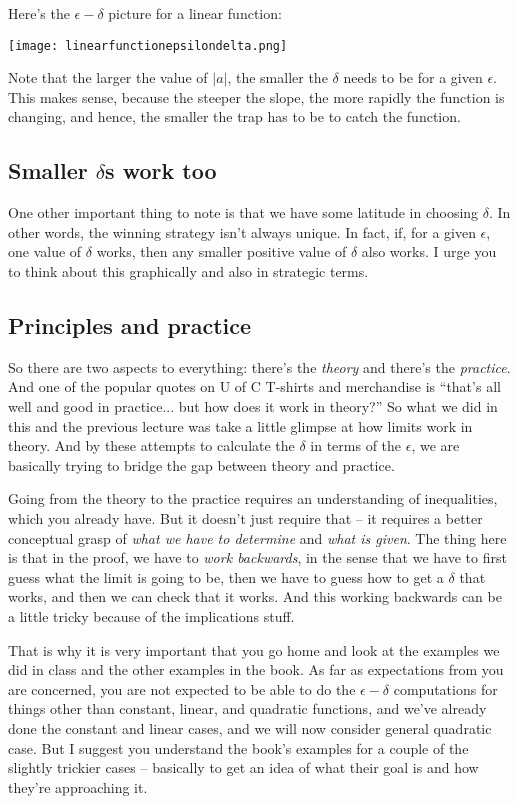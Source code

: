 \documentclass[10pt]{amsart}
\begin{document}
Here's the $\epsilon-\delta$ picture for a linear function:

\texttt{[image: linearfunctionepsilondelta.png]}

Note that the larger the value of $|a|$, the smaller the $\delta$
needs to be for a given $\epsilon$. This makes sense, because the
steeper the slope, the more rapidly the function is changing, and
hence, the smaller the trap has to be to catch the function.

\subsection{Smaller $\delta$s work too}

One other important thing to note is that we have some latitude in
choosing $\delta$. In other words, the winning strategy isn't always
unique. In fact, if, for a given $\epsilon$, one value of $\delta$
works, then any smaller positive value of $\delta$ also works. I urge
you to think about this graphically and also in strategic terms.

\subsection{Principles and practice}

So there are two aspects to everything: there's the {\em theory} and
there's the {\em practice}. And one of the popular quotes on U of C
T-shirts and merchandise is ``that's all well and good in
practice... but how does it work in theory?'' So what we did in this
and the previous lecture was take a little glimpse at how limits work
in theory. And by these attempts to calculate the $\delta$ in terms of
the $\epsilon$, we are basically trying to bridge the gap between
theory and practice.

Going from the theory to the practice requires an understanding of
inequalities, which you already have. But it doesn't just require that
-- it requires a better conceptual grasp of {\em what we have to
determine} and {\em what is given}. The thing here is that in the
proof, we have to {\em work backwards}, in the sense that we have to
first guess what the limit is going to be, then we have to guess how
to get a $\delta$ that works, and then we can check that it works. And
this working backwards can be a little tricky because of the
implications stuff.

That is why it is very important that you go home and look at the
examples we did in class and the other examples in the book. As far as
expectations from you are concerned, you are not expected to be able
to do the $\epsilon-\delta$ computations for things other than
constant, linear, and quadratic functions, and we've already done the
constant and linear cases, and we will now consider general quadratic
case. But I suggest you understand the book's examples for a couple of
the slightly trickier cases -- basically to get an idea of what their
goal is and how they're approaching it.
\end{document}
